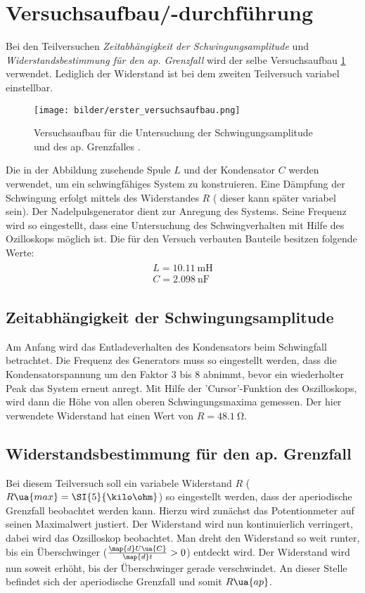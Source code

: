 \section{Versuchsaufbau/-durchführung}
Bei den Teilversuchen \emph{Zeitabhängigkeit der Schwingungsamplitude}
und \emph{Widerstandsbestimmung für den ap. Grenzfall} wird der selbe
Versuchsaufbau \ref{fig:aufbau_eins} verwendet. Lediglich der Widerstand ist bei dem
zweiten Teilversuch variabel einstellbar.
\begin{figure}
  \centering
  \texttt{[image: bilder/erster\_versuchsaufbau.png]}
  \caption{Versuchsaufbau für die Untersuchung der Schwingungsamplitude und des ap. Grenzfalles \cite{anleitung354}. }
  \label{fig:aufbau_eins}
\end{figure}
Die in der Abbildung zusehende Spule $L$ und der Kondensator $C$ werden verwendet, um
ein schwingfähiges System zu konstruieren. Eine Dämpfung der Schwingung
erfolgt mittels des Widerstandes $R$ ( dieser kann später variabel sein).
Der Nadelpulsgenerator dient zur Anregung des Systems. Seine Frequenz wird so
eingestellt, dass eine Untersuchung des Schwingverhalten mit Hilfe des
Ozilloskops möglich ist. Die für den Versuch verbauten Bauteile besitzen folgende
Werte:
\begin{align}
  \label{eq:bauelemente_1}
  \begin{aligned}
    L=\SI{10.11}{\milli\henry}\\
    C=\SI{2.098}{\nano\farad}
  \end{aligned}
\end{align}
\subsection{Zeitabhängigkeit der Schwingungsamplitude}
Am Anfang wird das Entladeverhalten des Kondensators beim Schwingfall betrachtet.
Die Frequenz des Generators muss %
so eingestellt werden, dass die Kondensatorspannung um den Faktor $3$ bis $8$
abnimmt, bevor ein wiederholter Peak das System erneut anregt.
Mit Hilfe der 'Cursor'-Funktion des Oszilloskops, wird dann %
die Höhe von allen oberen Schwingungsmaxima gemessen.
Der hier verwendete Widerstand hat einen Wert von $R=\SI{48.1}{\ohm}$.
\subsection{Widerstandsbestimmung für den ap. Grenzfall}
Bei diesem Teilversuch soll ein variabele Widerstand $R$ ($R\ua{max}=\SI{5}{\kilo\ohm}$) so eingestellt werden,
dass der aperiodische Grenzfall beobachtet werden kann.
Hierzu wird zunächst das Potentionmeter auf seinen Maximalwert justiert.
Der Widerstand wird nun kontinuierlich verringert, dabei wird das %
Ozsilloskop beobachtet. Man dreht den Widerstand so weit runter, bis %
ein Überschwinger ($\frac{\map{d}U\ua{C}}{\map{d}t}>0$) entdeckt wird.
Der Widerstand wird nun soweit erhöht, bis der Überschwinger gerade verschwindet.
An dieser Stelle befindet sich der aperiodische Grenzfall und somit $R\ua{ap}$. %
